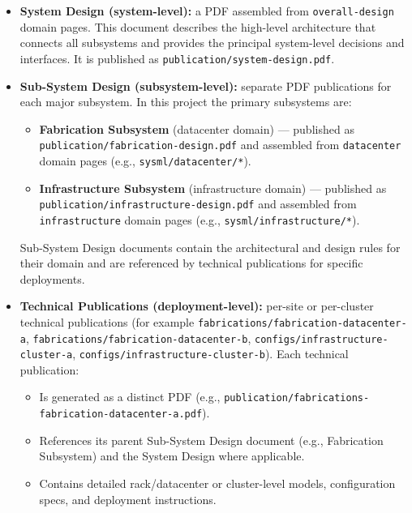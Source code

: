 \documentclass[12pt]{article}
\providecommand{\tightlist}{%
  \setlength{\itemsep}{0pt}\setlength{\parskip}{0pt}}
\begin{document}
\begin{itemize}
\item
  \textbf{System Design (system-level):} a PDF assembled from
  \texttt{overall-design} domain pages. This document describes the
  high-level architecture that connects all subsystems and provides the
  principal system-level decisions and interfaces. It is published as
  \texttt{publication/system-design.pdf}.
\item
  \textbf{Sub-System Design (subsystem-level):} separate PDF
  publications for each major subsystem. In this project the primary
  subsystems are:

  \begin{itemize}
  \tightlist
  \item
    \textbf{Fabrication Subsystem} (datacenter domain) --- published as
    \texttt{publication/fabrication-design.pdf} and assembled from
    \texttt{datacenter} domain pages (e.g.,
    \texttt{sysml/datacenter/*}).
  \item
    \textbf{Infrastructure Subsystem} (infrastructure domain) ---
    published as \texttt{publication/infrastructure-design.pdf} and
    assembled from \texttt{infrastructure} domain pages (e.g.,
    \texttt{sysml/infrastructure/*}).
  \end{itemize}

  Sub-System Design documents contain the architectural and design rules
  for their domain and are referenced by technical publications for
  specific deployments.
\item
  \textbf{Technical Publications (deployment-level):} per-site or
  per-cluster technical publications (for example
  \texttt{fabrications/fabrication-datacenter-a},
  \texttt{fabrications/fabrication-datacenter-b},
  \texttt{configs/infrastructure-cluster-a},
  \texttt{configs/infrastructure-cluster-b}). Each technical
  publication:

  \begin{itemize}
  \tightlist
  \item
    Is generated as a distinct PDF (e.g.,
    \texttt{publication/fabrications-fabrication-datacenter-a.pdf}).
  \item
    References its parent Sub-System Design document (e.g., Fabrication
    Subsystem) and the System Design where applicable.
  \item
    Contains detailed rack/datacenter or cluster-level models,
    configuration specs, and deployment instructions.
  \end{itemize}
\end{itemize}
\end{document}
